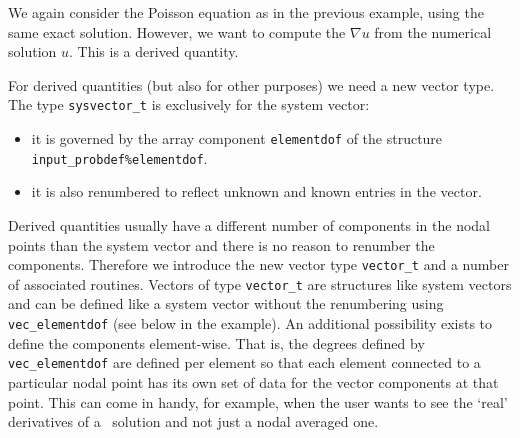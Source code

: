 We again consider the Poisson equation as in the previous example, using the
same exact solution. However, we want to compute the $\nabla u$ from the
numerical solution $u$. This is a derived quantity. 

For derived quantities (but also for other purposes) we need a new vector type.
The type \texttt{sysvector\_t} is exclusively for the system vector:
\begin{itemize}
   \item it is governed by the array component \texttt{elementdof} of
      the structure \texttt{input\_probdef\%elementdof}.
   \item it is also renumbered to reflect unknown and known entries in the
      vector.
\end{itemize}
Derived quantities usually have a different number of components in the nodal
points than the system vector and there is no reason to renumber the
components. Therefore we introduce the new vector type \texttt{vector\_t} and
a number of associated routines. Vectors of type \texttt{vector\_t} are
structures like system vectors and can be defined like a system vector without
the renumbering using \texttt{vec\_elementdof} (see below in the example). An
additional possibility exists to define the components element-wise. That is,
the degrees defined by \texttt{vec\_elementdof} are defined per element so that
each element connected to a particular nodal point has its own set of
data for the
vector components at that point. This can come in handy, for example, when the
user wants to see the `real' derivatives of a \fem\ solution and not just
a nodal averaged one.

